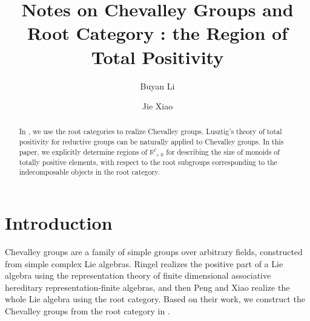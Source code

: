 \documentclass[12pt]{amsart}
\begin{document}
\title[Notes on Chevalley Groups and Root Category III]
{Notes on Chevalley Groups and Root Category \uppercase\expandafter{}: the Region of Total Positivity}




\author[Buyan Li]{Buyan Li}
\address{Department of Mathematical Sciences, Tsinghua University, Beijing 100084, P. R. China}

\author[Jie Xiao]{Jie Xiao}
\address{School of Mathematical Sciences, Beijing Normal University, Beijing 100875, P. R. China}













\maketitle

\begin{abstract}
    In \cite{notes1}, we use the root categories to realize Chevalley groups.
    Lusztig's theory of total positivity for reductive groups can be naturally applied to Chevalley groups.
    In this paper, we explicitly determine regions of $\mathbb{R}_{>0}^t$ for describing the size of monoids of totally positive elements, with respect to the root subgroups corresponding to the indecomposable objects in the root category.
\end{abstract}

\setcounter{tocdepth}{2}\tableofcontents

\section{Introduction}

Chevalley groups are a family of simple groups over arbitrary fields, constructed from simple complex Lie algebras.
Ringel \cite{RINGEL1990137} realizes the positive part of a Lie algebra using the representation theory of finite dimensional associative hereditary representation-finite algebras, and then Peng and Xiao \cite{1997ROOT} realize the whole Lie algebra using the root category.
Based on their work, we construct the Chevalley groups from the root category in \cite{notes1}.
\end{document}
